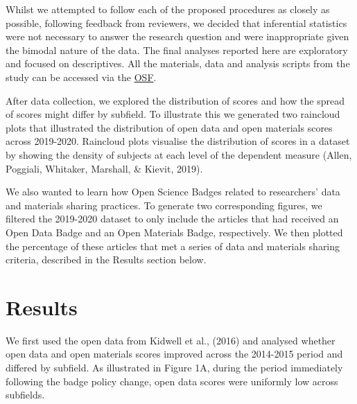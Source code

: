 \documentclass[
  english,
  man,floatsintext]{apa6}
\begin{document}
Whilst we attempted to follow each of the proposed procedures as closely as possible, following feedback from reviewers, we decided that inferential statistics were not necessary to answer the research question and were inappropriate given the bimodal nature of the data. The final analyses reported here are exploratory and focused on descriptives. All the materials, data and analysis scripts from the study can be accessed via the \href{https://osf.io/z8b7j/?view_only=b97cd4c4f6d645bc9e8870d97b6f3da4}{OSF}.

After data collection, we explored the distribution of scores and how the spread of scores might differ by subfield. To illustrate this we generated two raincloud plots that illustrated the distribution of open data and open materials scores across 2019-2020. Raincloud plots visualise the distribution of scores in a dataset by showing the density of subjects at each level of the dependent measure (Allen, Poggiali, Whitaker, Marshall, \& Kievit, 2019).

We also wanted to learn how Open Science Badges related to researchers' data and materials sharing practices. To generate two corresponding figures, we filtered the 2019-2020 dataset to only include the articles that had received an Open Data Badge and an Open Materials Badge, respectively. We then plotted the percentage of these articles that met a series of data and materials sharing criteria, described in the Results section below.

\hypertarget{results}{%
\section{Results}\label{results}}

We first used the open data from Kidwell et al., (2016) and analysed whether open data and open materials scores improved across the 2014-2015 period and differed by subfield. As illustrated in Figure 1A, during the period immediately following the badge policy change, open data scores were uniformly low across subfields.
\end{document}

